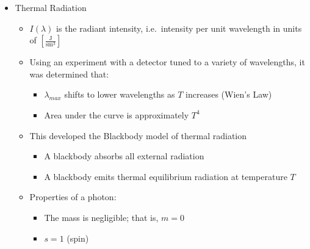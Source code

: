 \begin{itemize}
\begin{itemize}
\begin{itemize}
\begin{itemize}
            \end{itemize}

        \end{itemize}

    \end{itemize}

  \item Thermal Radiation

    \begin{itemize}

      \item $I(\lambda)$ is the radiant intensity, i.e.\ intensity per unit wavelength in units of $\left[ \frac{\si{\joule}}{\si{\second\meter\cubed}} \right]$

      \item Using an experiment with a detector tuned to a variety of wavelengths, it was determined that:

        \begin{itemize}

          \item $\lambda_{max}$ shifts to lower wavelengths as $T$ increases (Wien's Law)

          \item Area under the curve is approximately $T^4$

        \end{itemize}

      \item This developed the Blackbody model of thermal radiation

        \begin{itemize}

          \item A blackbody absorbs all external radiation

          \item A blackbody emits thermal equilibrium radiation at temperature $T$

        \end{itemize}

        \newpage

      \item Properties of a photon:

        \begin{itemize}

          \item The mass is negligible; that is, $m=0$

          \item $s=1$ (spin)


\end{itemize}
\end{itemize}
\end{itemize}
